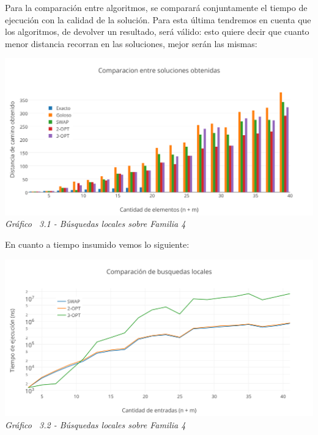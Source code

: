 Para la comparación entre algoritmos, se comparará conjuntamente el tiempo de ejecución con la calidad de la solución. Para esta última tendremos en cuenta que los algoritmos, de devolver un resultado, será válido: esto quiere decir que cuanto menor distancia recorran en las soluciones, mejor serán las mismas:

\vspace*{0.3cm} \vspace*{0.3cm}
  \begin{center}
 \includegraphics[scale=0.5]{./EJ3/comparacionbusquedaslocalessoluciongym0.png}\\
 {            \textit{Gráfico \ 3.1 - Búsquedas locales sobre Familia 4}}
  \end{center}
  \vspace*{0.3cm}
  
En cuanto a tiempo insumido vemos lo siguiente:

\vspace*{0.3cm} \vspace*{0.3cm}
  \begin{center}
 \includegraphics[scale=0.5]{./EJ3/comparacionbusquedaslocalesgym0.png}\\
 {            \textit{Gráfico \ 3.2 - Búsquedas locales sobre Familia 4}}
  \end{center}
  \vspace*{0.3cm}

